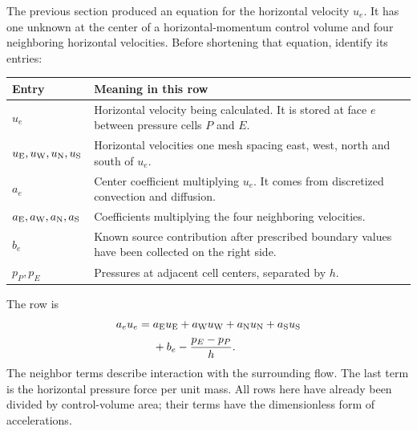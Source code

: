 The previous section produced an equation for the horizontal velocity $u_e$.
It has one unknown at the center of a horizontal-momentum control volume and
four neighboring horizontal velocities. Before shortening that equation,
identify its entries:
\begin{center}\begin{tabular}{lp{.76\linewidth}}\toprule
Entry & Meaning in this row\\\midrule
$u_e$ & Horizontal velocity being calculated. It is stored at face $e$ between pressure cells $P$ and $E$.\\
$u_{\rm E},u_{\rm W},u_{\rm N},u_{\rm S}$ & Horizontal velocities one mesh spacing east, west, north and south of $u_e$.\\
$a_e$ & Center coefficient multiplying $u_e$. It comes from discretized convection and diffusion.\\
$a_{\rm E},a_{\rm W},a_{\rm N},a_{\rm S}$ & Coefficients multiplying the four neighboring velocities.\\
$b_e$ & Known source contribution after prescribed boundary values have been collected on the right side.\\
$p_P,p_E$ & Pressures at adjacent cell centers, separated by $h$.\\\bottomrule
\end{tabular}\end{center}
The row is
\begin{align*}
a_eu_e={}&a_{\rm E}u_{\rm E}+a_{\rm W}u_{\rm W}
          +a_{\rm N}u_{\rm N}+a_{\rm S}u_{\rm S}\\
        &+b_e-\frac{p_E-p_P}{h}.
\end{align*}
The neighbor terms describe interaction with the surrounding flow. The last
term is the horizontal pressure force per unit mass. All rows here have
already been divided by control-volume area; their terms have the
dimensionless form of accelerations.

